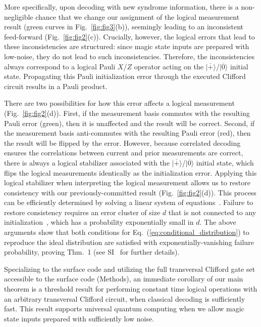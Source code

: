 \documentclass[prl,twocolumn,superscriptaddress,secnumarabic,balancelastpage,amsmath,amssymb]{revtex4-2}
\newcommand{\lket}[1]{|{\overline{#1}}\rangle}
\begin{document}
More specifically, upon decoding with new syndrome information, there is a non-negligible chance that we change our assignment of the logical measurement result (green curves in Fig.~\ref{fig:fig3}(b)), seemingly leading to an inconsistent feed-forward (Fig.~\ref{fig:fig2}(c)).
%
Crucially, however, the logical errors that lead to these inconsistencies are structured: since magic state inputs are prepared with low-noise, they do not lead to such inconsistencies.
%
Therefore, the inconsistencies always correspond to a logical Pauli $X$/$Z$ operator acting on the $\lket{+}$/$\lket{0}$ initial state.
%
Propagating this Pauli initialization error through the executed Clifford circuit results in a Pauli product.

There are two possibilities for how this error affects a logical measurement (Fig.~\ref{fig:fig2}(d)).
%
First, if the measurement basis commutes with the resulting Pauli error (green), then it is unaffected and the result will be correct.
%
Second, if the measurement basis anti-commutes with the resulting Pauli error (red), then the result will be flipped by the error.
%
However, because correlated decoding ensures the correlations between current and prior measurements are correct, there is always a logical stabilizer associated with the $\lket{+}$/$\lket{0}$ initial state, which flips the logical measurements identically as the initialization error.
%
Applying this logical stabilizer when interpreting the logical measurement allows us to restore consistency with our previously-committed result (Fig.~\ref{fig:fig2}(d)).
%
This process can be efficiently determined by solving a linear system of equations~\cite{SM}.
%
Failure to restore consistency requires an error cluster of size $d$ that is not connected to any initialization~\cite{SM}, which has a probability exponentially small in $d$.
%
The above arguments show that both conditions for Eq.~(\ref{eq:conditional_distribution}) to reproduce the ideal distribution are satisfied with exponentially-vanishing failure probability, proving Thm.~1 (see SI~\cite{SM} for further details).

Specializing to the surface code and utilizing the full transversal Clifford gate set accessible to the surface code (Methods), an immediate corollary of our main theorem is a threshold result for performing constant time logical operations with an arbitrary transversal Clifford circuit, when classical decoding is sufficiently fast.
%
This result supports universal quantum computing when we allow magic state inputs prepared with sufficiently low noise.
\end{document}
